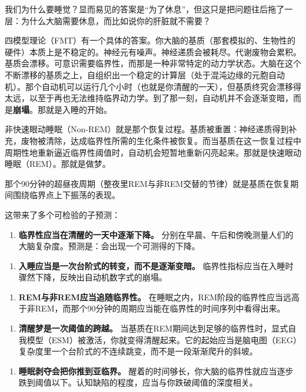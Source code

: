 \documentclass[11pt, twoside, openright]{book}
\begin{document}
我们为什么要睡觉？显而易见的答案是“为了休息”，但这只是把问题往后拖了一层：为什么大脑需要休息，而比如说你的肝脏就不需要？

四模型理论（FMT）有一个具体的答案。你大脑的基质（那套模拟的、生物性的硬件）本质上是不稳定的。神经元有噪声。神经递质会被耗尽。代谢废物会累积。基质会漂移。可意识需要临界性，而那是一种非常特定的动力学状态。大脑在这个不断漂移的基质之上，自组织出一个稳定的计算层（处于混沌边缘的元胞自动机）。那个自动机可以运行几个小时（也就是你清醒的一天），但基质终究会漂移得太远，以至于再也无法维持临界动力学。到了那一刻，自动机并不会逐渐变暗，而是\textbf{崩塌}。那就是入睡的开始。

非快速眼动睡眠（Non-REM）就是那个恢复过程。基质被重置：神经递质得到补充，废物被清除，达成临界性所需的生化条件被恢复。而当基质在这一恢复过程中周期性地重新逼近临界性阈值时，自动机会短暂地重新闪亮起来。那就是快速眼动睡眠（REM）。那就是做梦。

那个90分钟的超昼夜周期（整夜里REM与非REM交替的节律）就是基质在恢复期间围绕临界点上下振荡的表现。

这带来了多个可检验的子预测：

\begin{enumerate}
  \item \textbf{临界性应当在清醒的一天中逐渐下降。} 分别在早晨、午后和傍晚测量人们的大脑复杂度。预测是：会出现一个可测得的下降。
\end{enumerate}

\begin{enumerate}
  \item \textbf{入睡应当是一次台阶式的转变，而不是逐渐变暗。} 临界性指标应当在入睡时骤然下降，反映出自动机数字式的崩塌。
\end{enumerate}

\begin{enumerate}
  \item \textbf{REM与非REM应当追随临界性。} 在睡眠之内，REM阶段的临界性应当远高于非REM，而那个90分钟的周期应当能在临界性的时间序列中看得出来。
\end{enumerate}

\begin{enumerate}
  \item \textbf{清醒梦是一次阈值的跨越。} 当基质在REM期间达到足够的临界性时，显式自我模型（ESM）被激活，你就变得清醒起来。它的起始应当是脑电图（EEG）复杂度里一个台阶式的不连续跳变，而不是一段渐渐爬升的斜坡。
\end{enumerate}

\begin{enumerate}
  \item \textbf{睡眠剥夺会把你推到亚临界。} 醒着的时间够长，你大脑的临界性就应当逐步跌到阈值以下。认知缺陷的程度，应当与你跌破阈值的深度相关。
\end{enumerate}
\end{document}
